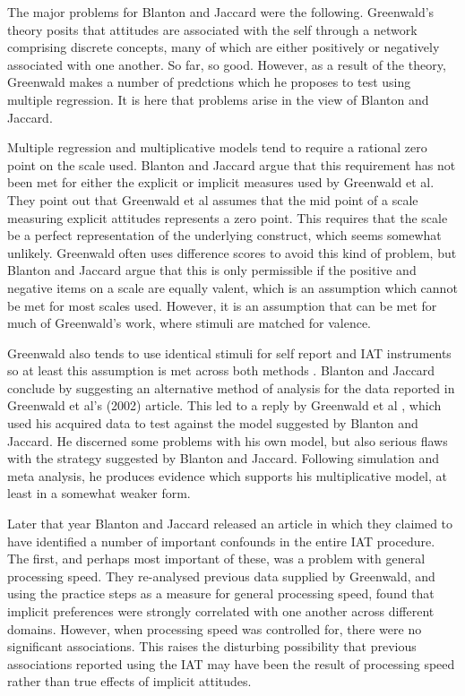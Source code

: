 The major problems for Blanton and Jaccard \cite{Blanton2006a} were the following. Greenwald's theory posits that attitudes are associated with the self through a network comprising discrete concepts, many of which are either positively or negatively associated with one another. So far, so good. However, as a result of the theory, Greenwald makes a number of predctions which he proposes to test using multiple regression. It is here that problems arise in the view of Blanton and Jaccard. 

Multiple regression and multiplicative models tend to require a rational zero point on the scale used. Blanton and Jaccard argue that this requirement has not been met for either the explicit or implicit measures used by Greenwald et al. They point out that Greenwald et al \cite{greenwald2002} assumes that the mid point of a scale measuring explicit attitudes represents a zero point. This requires that the scale be a perfect representation of the underlying construct, which seems somewhat unlikely. Greenwald often uses difference scores to avoid this kind of problem, but Blanton and Jaccard argue that this is only permissible if the positive and negative items on a scale are equally valent, which is an assumption which cannot be met for most scales used. However, it is an assumption that can be met for much of Greenwald's work, where stimuli are matched for valence. 

Greenwald also tends to use identical stimuli for self report and IAT instruments so at least this assumption is met across both methods \cite{Farnham1999,Greenwald1998}. Blanton and Jaccard conclude by suggesting an alternative method of analysis for the data reported in Greenwald et al's (2002) article. This led to a reply by Greenwald et al \cite{Greenwald2006b}, which used his acquired data to test against the model suggested by Blanton and Jaccard. He discerned some problems with his own model, but also serious flaws with the strategy suggested by Blanton and Jaccard. Following simulation and meta analysis, he produces evidence which supports his multiplicative model, at least in a somewhat weaker form. 



Later that year Blanton and Jaccard released an article \cite{Blanton2006} in which they claimed to have identified a number of important confounds in the entire IAT procedure. The first, and perhaps most important of these, was a problem with general processing speed. They re-analysed previous data supplied by Greenwald, and using the practice steps as a measure for general processing speed, found that implicit preferences were strongly correlated with one another across different domains. However, when processing speed was controlled for, there were no significant associations. This raises the disturbing possibility that previous associations reported using the IAT may have been the result of processing speed rather than true effects of implicit attitudes.

